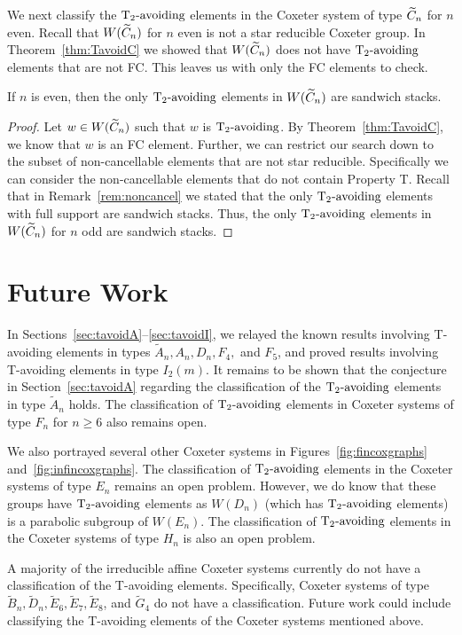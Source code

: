We next classify the $\operatorname{T_2-\mathrm{avoiding}}$ elements in the Coxeter system of type $\widetilde{C}_n$ for $n$ even. Recall that $W(\widetilde{C}_n)$ for $n$ even is not a star reducible Coxeter group. In Theorem~\ref{thm:TavoidC} we showed that $W(\widetilde{C}_n)$ does not have $\operatorname{T_2-\mathrm{avoiding}}$ elements that are not FC. This leaves us with only the FC elements to check.

\begin{theorem}
	If $n$ is even, then the only $\operatorname{T_2-\mathrm{avoiding}}$ elements in $W(\widetilde{C}_n)$ are sandwich stacks.
	\begin{proof}
		Let $w \in W(\widetilde{C}_n)$ such that $w$ is $\operatorname{T_2-\mathrm{avoiding}}$. By Theorem~\ref{thm:TavoidC}, we know that $w$ is an FC element. Further, we can restrict our search down to the subset of non-cancellable elements that are not star reducible. Specifically we can consider the non-cancellable elements that do not contain Property T. Recall that in Remark~\ref{rem:noncancel} we stated that the only $\operatorname{T_2-\mathrm{avoiding}}$ elements with full support are sandwich stacks. Thus, the only $\operatorname{T_2-\mathrm{avoiding}}$ elements in $W(\widetilde{C}_n)$ for $n$ odd are sandwich stacks.
	\end{proof}
\end{theorem}


\section{Future Work}\label{sec:open}
In Sections~\ref{sec:tavoidA}--\ref{sec:tavoidI}, we relayed the known results involving T-avoiding elements in types $\widetilde{A}_n, A_n, D_n, F_4,$ and $F_5$, and proved results involving T-avoiding elements in type $I_2(m)$. It remains to be shown that the conjecture in Section~\ref{sec:tavoidA} regarding the classification of the $\operatorname{T_2-\mathrm{avoiding}}$ elements in type $\widetilde{A}_n$ holds. The classification of $\operatorname{T_2-\mathrm{avoiding}}$ elements in Coxeter systems of type $F_n$ for $n \geq 6$ also remains open.

We also portrayed several other Coxeter systems in Figures~\ref{fig:fincoxgraphs} and~\ref{fig:infincoxgraphs}. The classification of $\operatorname{T_2-\mathrm{avoiding}}$ elements in the Coxeter systems of type $E_n$ remains an open problem. However, we do know that these groups have $\operatorname{T_2-\mathrm{avoiding}}$ elements as $W(D_n)$ (which has $\operatorname{T_2-\mathrm{avoiding}}$ elements) is a parabolic subgroup of $W(E_n)$. The classification of $\operatorname{T_2-\mathrm{avoiding}}$ elements in the Coxeter systems of type $H_n$ is also an open problem. 

A majority of the irreducible affine Coxeter systems  currently do not have a classification of the T-avoiding elements. Specifically, Coxeter systems of type $\widetilde{B}_n, \widetilde{D}_n, \widetilde{E}_6, \widetilde{E}_7, \widetilde{E}_8$, and $\widetilde{G}_4$ do not have a classification. Future work could include classifying the T-avoiding elements of the Coxeter systems mentioned above.